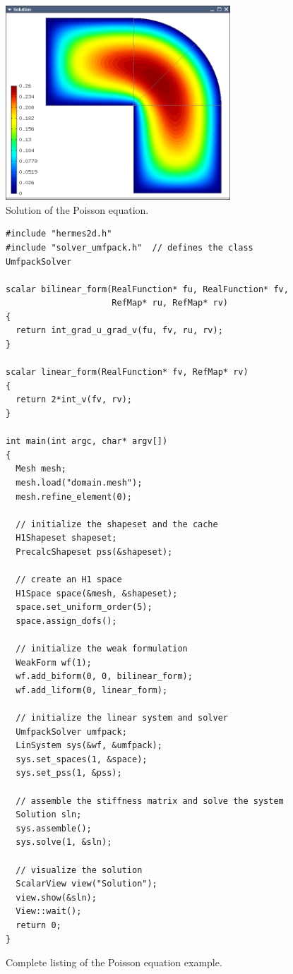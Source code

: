 \begin{figure}[ht]
  \centering\medskip
  \includegraphics[width=0.75\textwidth]{img/poisson.png}
  \caption{Solution of the Poisson equation.}
  \label{fig:poisson}
\end{figure}



\begin{figure}[p]
\begin{lstlisting}
#include "hermes2d.h"
#include "solver_umfpack.h"  // defines the class UmfpackSolver

scalar bilinear_form(RealFunction* fu, RealFunction* fv,
                     RefMap* ru, RefMap* rv)
{
  return int_grad_u_grad_v(fu, fv, ru, rv);
}

scalar linear_form(RealFunction* fv, RefMap* rv)
{
  return 2*int_v(fv, rv);
}

int main(int argc, char* argv[])
{
  Mesh mesh;
  mesh.load("domain.mesh");
  mesh.refine_element(0);

  // initialize the shapeset and the cache
  H1Shapeset shapeset;
  PrecalcShapeset pss(&shapeset);

  // create an H1 space
  H1Space space(&mesh, &shapeset);
  space.set_uniform_order(5);
  space.assign_dofs();

  // initialize the weak formulation
  WeakForm wf(1);
  wf.add_biform(0, 0, bilinear_form);
  wf.add_liform(0, linear_form);

  // initialize the linear system and solver
  UmfpackSolver umfpack;
  LinSystem sys(&wf, &umfpack);
  sys.set_spaces(1, &space);
  sys.set_pss(1, &pss);

  // assemble the stiffness matrix and solve the system
  Solution sln;
  sys.assemble();
  sys.solve(1, &sln);

  // visualize the solution
  ScalarView view("Solution");
  view.show(&sln);
  View::wait();
  return 0;
}
\end{lstlisting}
  \vspace{-2mm}
  \caption{Complete listing of the Poisson equation example.}
  \label{fig:poissoncomplete}
\end{figure}


